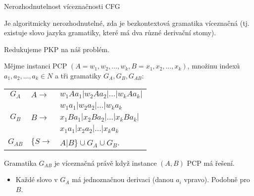     
    \begin{frame}{Nerozhodnutelnost víceznačnosti CFG}
     \begin{theorem}
    Je algoritmicky nerozhodnutelné, zda je bezkontextová gramatika víceznačná (tj. existuje slovo jazyka gramatiky, které má dva různé derivační stomy).
    \end{theorem}
    \pause
    \begin{minipage}{0.25\textwidth}
    \end{minipage}
    \begin{minipage}{0.68\textwidth}
    Redukujeme PKP na náš problém.
    \pause
    
    Mějme instanci PCP $(A=w_1,w_2,\ldots, w_k,B=x_1,x_2,\ldots, x_k)$,  \pause množinu indexů $a_1,a_2,\ldots, a_k\in N$ \pause a tři gramatiky $G_A, G_B,G_{AB} $:\\
    \begin{tabular}{c l l}
    $G_A$ & $A\rightarrow$ & $w_1Aa_1 |w_2Aa_2 |\ldots |w_kAa_k |  $\\
     &  & $w_1a_1 |w_2a_2 |\ldots |w_ka_k  $\\\pause
    $G_B$ & $B\rightarrow$ & $x_1Ba_1 |x_2Ba_2 |\ldots |x_kBa_k | $\\
     &  & $x_1a_1 |x_2a_2 |\ldots |x_ka_k  $\\\pause
    $G_{AB}$ & $\{S\rightarrow$ & $A|B\}\cup G_A \cup G_B$.
    \end{tabular}
    \pause
    
    Gramatika $G_{AB}$ je víceznačná právě když instance $(A,B)$  PCP má řešení.
    \begin{itemize}
        \item Každé slovo v $G_A$ má jednoznačnou derivaci (danou $a_i$ vpravo). Podobně pro $B$. 
    \end{itemize}
    \end{minipage}
    \end{frame}
    
    
    
